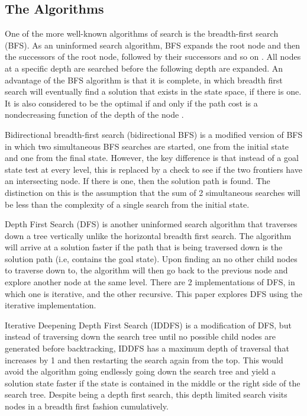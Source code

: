 \documentclass[conference]{IEEEtran}
\begin{document}
\subsection{The Algorithms}

One of the more well-known algorithms of search is the breadth-first search (BFS). As an uninformed search algorithm, BFS expands the root node and then the successors of the root node, followed by their successors and so on \cite{Textbook01}. All nodes at a specific depth are searched before the following depth are expanded. An advantage of the BFS algorithm is that it is complete, in which breadth first search will eventually find a solution that exists in the state space, if there is one. It is also considered to be the optimal if and only if the path cost is a nondecreasing function of the depth of the node \cite{Textbook01}.

Bidirectional breadth-first search (bidirectional BFS) is a modified version of BFS in which two simultaneous BFS searches are started, one from the initial state and one from the final state. However, the key difference is that instead of a goal state test at every level, this is replaced by a check to see if the two frontiers have an intersecting node. If there is one, then the solution path is found. The distinction on this is the assumption that the sum of 2 simultaneous searches will be less than the complexity of a single search from the initial state. 

Depth First Search (DFS) is another uninformed search algorithm that traverses down a tree vertically unlike the horizontal breadth first search. The algorithm will arrive at a solution faster if the path that is being traversed down is the solution path (i.e, contains the goal state). Upon finding an no other child nodes to traverse down to, the algorithm will then go back to the previous node and explore another node at the same level. There are 2 implementations of DFS, in which one is iterative, and the other recursive. This paper explores DFS using the iterative implementation.

Iterative Deepening Depth First Search (IDDFS) is a modification of DFS, but instead of traversing down the search tree until no possible child nodes are generated before backtracking, IDDFS has a maximum depth of traversal that increases by 1 and then restarting the search again from the top. This would avoid the algorithm going endlessly going down the search tree and yield a solution state faster if the state is contained in the middle or the right side of the search tree. Despite being a depth first search, this depth limited search visits nodes in a breadth first fashion cumulatively.  
\end{document}
